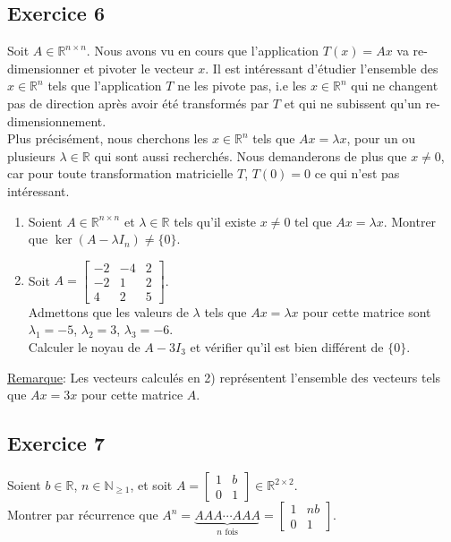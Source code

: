 \documentclass{article}
\newcommand{\N}{\mathbb{N}}
\newcommand{\R}{\mathbb{R}}
\newcommand{\cross}{\times}
\begin{document}
\subsection*{Exercice 6}
\noindent Soit $A \in \R^{n \cross n}$. Nous avons vu en cours que l'application $T(x)=Ax$ va re-dimensionner et pivoter le vecteur $x$. Il est intéressant d'étudier l'ensemble des $x \in \R^n$ tels que l'application $T$ ne les pivote pas, i.e les $x \in \R^n$ qui ne changent pas de direction après avoir été transformés par $T$ et qui ne subissent qu'un re-dimensionnement. \\
Plus précisément, nous cherchons les $x \in \R^n$ tels que $Ax=\lambda x$, pour un ou plusieurs $\lambda \in \R$ qui sont aussi recherchés. Nous demanderons de plus que $x \neq 0$, car pour toute transformation matricielle $T$, $T(0)=0$ ce qui n'est pas intéressant.
\begin{enumerate}
    \item Soient $A \in \R^{n \cross n}$ et $\lambda \in \R$ tels qu'il existe $x \neq 0$ tel que $Ax = \lambda x$. Montrer que $\ker (A-\lambda I_n) \neq \{0\}$.
    \item Soit $A= \begin{bmatrix} -2 & -4 & 2 \\ -2 & 1 & 2 \\ 4 & 2 & 5 \end{bmatrix}$. \\
    Admettons que les valeurs de $\lambda$ tels que $Ax=\lambda x$ pour cette matrice sont $\lambda_1 = -5$, $\lambda_2 = 3$, $\lambda_3 = -6$. \\
    Calculer le noyau de $A-3 I_3$ et vérifier qu'il est bien différent de $\{0\}$.
\end{enumerate}
\underline{Remarque}: Les vecteurs calculés en 2) représentent l'ensemble des vecteurs tels que $Ax=3x$ pour cette matrice $A$. \\

\subsection*{Exercice 7}
\noindent Soient $b \in \R$, $n \in \N_{\geq 1}$, et soit $A = \begin{bmatrix} 1 & b \\ 0 & 1 \end{bmatrix} \in \R^{2 \cross 2}$. \\
Montrer par récurrence que $A^n = \underbrace{AAA\cdots AAA}_{n \text{ fois}} = \begin{bmatrix}
1 & nb \\ 0 & 1 \end{bmatrix}$.
\end{document}
